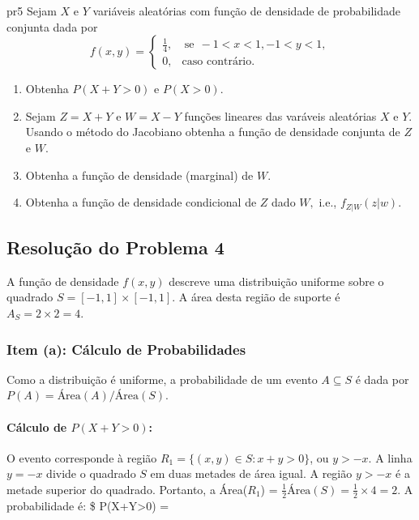 \documentclass[
]{article}
\begin{document}
\newpage
\begin{problema}{}{pr5}
Sejam $X$ e $Y$ variáveis aleatórias com função de densidade de probabilidade conjunta dada por 
$$ f(x,y) = 
\begin{cases}
    \frac{1}{4}, & \ \text{se} \  \  -1<x<1,  -1<y<1, \\
    0, &  \text{caso contrário.}
\end{cases}
$$

\begin{enumerate}
    \item  Obtenha $P(X+Y> 0)$ e $P(X>0).$
    \item Sejam $Z=X+Y$ e $W=X-Y$ funções lineares das varáveis aleatórias $X$ e $Y.$ Usando o método do Jacobiano obtenha a função de densidade conjunta de $Z$ e $W.$
    \item Obtenha a função de densidade (marginal) de $W$.
    \item  Obtenha a função de densidade condicional de $Z$ dado $W,$ i.e., $f_{Z|W}(z|w).$
\end{enumerate}
\end{problema}

\subsection*{Resolução do Problema 4}

A função de densidade \(f(x,y)\) descreve uma distribuição uniforme
sobre o quadrado \(S = [-1,1] \times [-1,1]\). A área desta região de
suporte é \(A_S = 2 \times 2 = 4\).

\subsubsection*{Item (a): Cálculo de Probabilidades}

Como a distribuição é uniforme, a probabilidade de um evento
\(A \subseteq S\) é dada por \(P(A) = \text{Área}(A) / \text{Área}(S)\).

\paragraph{Cálculo de $P(X+Y>0)$:}

O evento corresponde à região \(R_1 = \{ (x,y) \in S : x+y > 0 \}\), ou
\(y > -x\). A linha \(y=-x\) divide o quadrado \(S\) em duas metades de
área igual. A região \(y > -x\) é a metade superior do quadrado.
Portanto, a Área(\(R_1\)) =
\(\frac{1}{2} \text{Área}(S) = \frac{1}{2} \times 4 = 2\). A
probabilidade é: \$ P(X+Y\textgreater0) =
\end{document}
